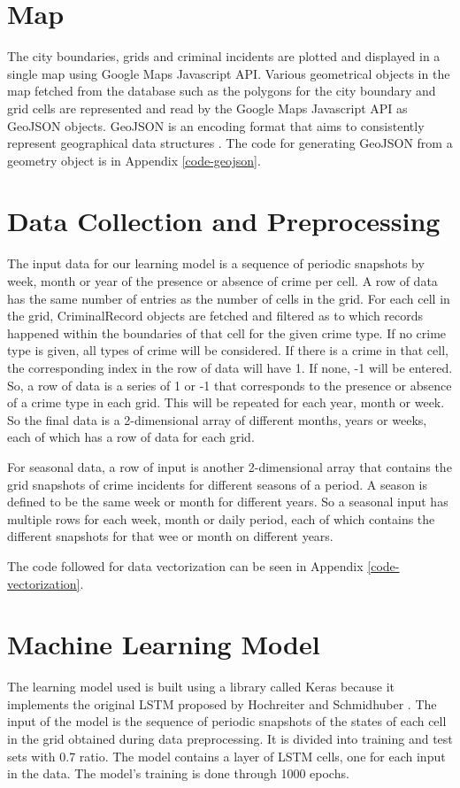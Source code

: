 \section{Map}
    The city boundaries, grids and criminal incidents are plotted and displayed in a single map using Google Maps Javascript API. Various geometrical objects in the map fetched from the database such as the polygons for the city boundary and grid cells are represented and read by the Google Maps Javascript API as GeoJSON objects. GeoJSON is an encoding format that aims to consistently represent geographical data structures \citep{butler2008geojson}. The code for generating GeoJSON from a geometry object is in Appendix \ref{code-geojson}.

\section{Data Collection and Preprocessing}
    The input data for our learning model is a sequence of periodic snapshots by week, month or year of the presence or absence of crime per cell. A row of data has the same number of entries as the number of cells in the grid. For each cell in the grid, CriminalRecord objects are fetched and filtered as to which records happened within the boundaries of that cell for the given crime type. If no crime type is given, all types of crime will be considered. If there is a crime in that cell, the corresponding index in the row of data will have 1. If none, -1 will be entered. So, a row of data is a series of 1 or -1 that corresponds to the presence or absence of a crime type in each grid. This will be repeated for each year, month or week. So the final data is a 2-dimensional array of different months, years or weeks, each of which has a row of data for each grid.

    For seasonal data, a row of input is another 2-dimensional array that contains the grid snapshots of crime incidents for different seasons of a period. A season is defined to be the same week or month for different years. So a seasonal input has multiple rows for each week, month or daily period, each of which contains the different snapshots for that wee or month on different years.

    The code followed for data vectorization can be seen in Appendix \ref{code-vectorization}.

\section{Machine Learning Model}
    The learning model used is built using a library called Keras because it implements the original LSTM proposed by Hochreiter and Schmidhuber \citeyearpar{hochreiter1997long}. The input of the model is the sequence of periodic snapshots of the states of each cell in the grid obtained during data preprocessing. It is divided into training and test sets with 0.7 ratio. The model contains a layer of LSTM cells, one for each input in the data. The model's training is done through 1000 epochs.

